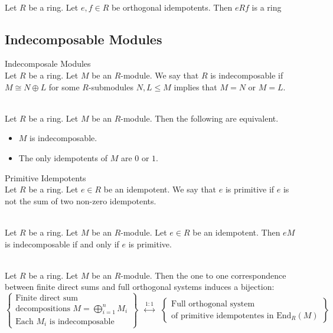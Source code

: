 \documentclass[a4paper]{article}
\begin{document}
\begin{prp}{}{}\\
Let $R$ be a ring. Let $e,f\in R$ be orthogonal idempotents. Then $eRf$ is a ring 
\end{prp}

\subsection{Indecomposable Modules}
\begin{defn}{Indecomposale Modules}{}\\
Let $R$ be a ring. Let $M$ be an $R$-module. We say that $R$ is indecomposable if $M\cong N\oplus L$ for some $R$-submodules $N,L\leq M$ implies that $M=N$ or $M=L$. 
\end{defn}

\begin{crl}{}{}\\
Let $R$ be a ring. Let $M$ be an $R$-module. Then the following are equivalent. 
\begin{itemize}
\item $M$ is indecomposable. 
\item The only idempotents of $M$ are $0$ or $1$. 
\end{itemize}
\end{crl}

\begin{defn}{Primitive Idempotents}{}\\
Let $R$ be a ring. Let $e\in R$ be an idempotent. We say that $e$ is primitive if $e$ is not the sum of two non-zero idempotents. 
\end{defn}

\begin{crl}{}{}\\
Let $R$ be a ring. Let $M$ be an $R$-module. Let $e\in R$ be an idempotent. Then $eM$ is indecomposable if and only if $e$ is primitive. 
\end{crl}

\begin{crl}{}{}\\
Let $R$ be a ring. Let $M$ be an $R$-module. Then the one to one correspondence between finite direct sums and full orthogonal systems induces a bijection: $$\left\{\substack{\text{Finite direct sum}\\\text{decompositions }M=\bigoplus_{i=1}^n M_i\\\text{Each }M_i\text{ is indecomposable }}\right\}\;\;\overset{1:1}{\longleftrightarrow}\;\;\left\{\substack{\text{Full orthogonal system}\\\text{of primitive idempotentes in }\text{End}_R(M)}\right\}$$
\end{crl}
\end{document}
